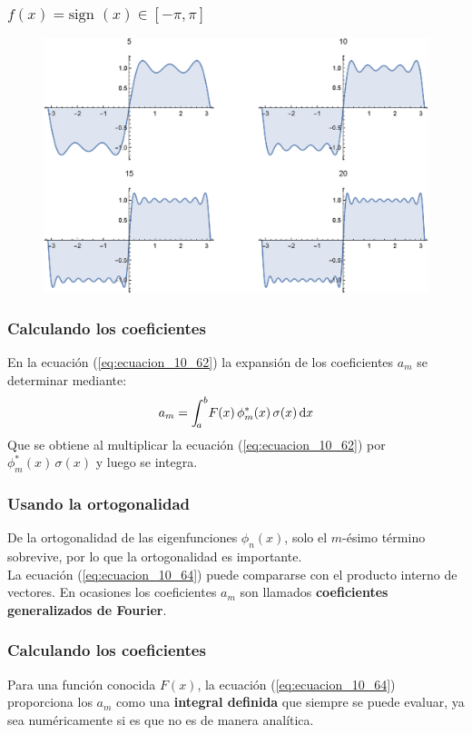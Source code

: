 \documentclass[12pt]{beamer}
\begin{document}
\begin{frame}
\frametitle{$f (x) = \mbox{sign } (x) \in [-\pi, \pi]$}
\begin{figure}
  \centering
  \includegraphics[scale=0.7]{Imagenes/Gibbs_Fourier.eps}
\end{figure}
\end{frame}
\begin{frame}
\frametitle{Calculando los coeficientes}
En la ecuación (\ref{eq:ecuacion_10_62}) la expansión de los coeficientes $a_{m}$ se determinar mediante:
\pause
\begin{align}
a_{m} = \scaleint{5ex}_{\bs a}^{b} F(x) \, \phi_{m}^{*} (x) \, \sigma (x) \dd{x}
\label{eq:ecuacion_10_64}
\end{align}
\pause
Que se obtiene al multiplicar la ecuación (\ref{eq:ecuacion_10_62}) por $\phi_{m}^{*} (x) \, \sigma (x)$ y luego se integra.
\end{frame}
\begin{frame}
\frametitle{Usando la ortogonalidad}
De la ortogonalidad de las eigenfunciones $\phi_{n}(x)$, solo el $m$-ésimo término sobrevive, por lo que la ortogonalidad es importante.
\\
\bigskip
\pause
La ecuación (\ref{eq:ecuacion_10_64}) puede compararse con el producto interno de vectores. \pause En ocasiones los coeficientes $a_{m}$ son llamados \textbf{coeficientes generalizados de Fourier}.
\end{frame}
\begin{frame}
\frametitle{Calculando los coeficientes}
Para una función conocida $F (x)$, la ecuación (\ref{eq:ecuacion_10_64}) proporciona los $a_{m}$ como una \textbf{integral definida} que siempre se puede evaluar, ya sea numéricamente si es que no es de manera analítica.
\end{frame}
\end{document}
